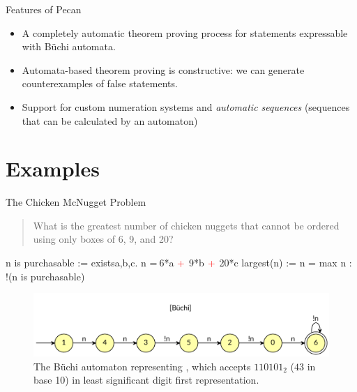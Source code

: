 \documentclass[leqno,presentation,usenames,dvipsnames]{beamer}
\begin{document}
\begin{frame}{Features of Pecan}
    \begin{itemize}
        \item A completely automatic theorem proving process for statements expressable with B\"uchi automata.
        \item Automata-based theorem proving is constructive: we can generate counterexamples of false statements.
        \item Support for custom numeration systems and \emph{automatic sequences} (sequences that can be calculated by an automaton)
    \end{itemize}
\end{frame}

\section{Examples}
\begin{frame}[fragile]{The Chicken McNugget Problem}
    
\begin{quote}
    What is the greatest number of chicken nuggets that cannot be ordered using only boxes of 6, 9, and 20?
\end{quote}

\begin{pecan}
n is purchasable := existsa,b,c. n =$\ $6*a $\color{red} +$ 9*b $\color{red} +$ 20*c
largest(n) := n = max { n : !(n is purchasable) }
\end{pecan}
\vspace{-1em}
\begin{figure}
    \centering
    \includegraphics[width=\textwidth]{images/largest_not_purchasable.pdf}
    \caption{The B\"uchi automaton representing , which accepts $110101_2$ ($43$ in base 10) in least significant digit first representation.}
    \label{fig:largest_non_purchasable}
\end{figure}
\end{frame}
\end{document}
